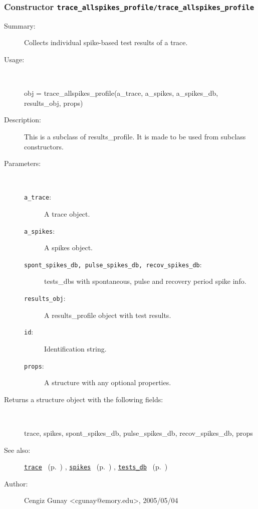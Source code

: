 \subsubsection[Constructor \texttt{trace\_allspikes\_profile}]{Constructor \texttt{trace\_allspikes\_profile/trace\_allspikes\_profile}}%
%
\label{ref_trace_allspikes_profile__trace_allspikes_profile}%
\hypertarget{ref_trace_allspikes_profile__trace_allspikes_profile}{}%
\begin{description}
\item[Summary:]Collects individual spike-based test results of a trace.
%
\item[Usage:]~%
\begin{lyxcode}%
obj = 
   trace\_allspikes\_profile(a\_trace, a\_spikes, a\_spikes\_db, results\_obj, props)
%
\end{lyxcode}%
%
\item[Description:]%
This is a subclass of results\_profile. It is made to be used from 
 subclass constructors.
\item[Parameters:]~
\begin{description}%
\item[\texttt{a\_trace}:]
 A trace object.
\item[\texttt{a\_spikes}:]
 A spikes object.
\item[\texttt{spont\_spikes\_db, pulse\_spikes\_db, recov\_spikes\_db}:]
 

tests\_dbs with spontaneous, pulse and recovery period spike info.
\item[\texttt{results\_obj}:]
 A results\_profile object with test results.
\item[\texttt{id}:]
 Identification string.
\item[\texttt{props}:]
 A structure with any optional properties.
\end{description}%
%
\item[Returns a structure object with the following fields:
]~

	trace, spikes, spont\_spikes\_db, 
	pulse\_spikes\_db, recov\_spikes\_db, props
%
%
\item[See also:]%
\hyperlink{ref_trace}{\texttt{trace}}%
\ (p.~\pageref{ref_trace})%
%
, \hyperlink{ref_spikes}{\texttt{spikes}}%
\ (p.~\pageref{ref_spikes})%
%
, \hyperlink{ref_tests_db}{\texttt{tests\_db}}%
\ (p.~\pageref{ref_tests_db})%
%
%
\item[Author:]%
Cengiz Gunay <cgunay@emory.edu>, 2005/05/04
%
\end{description}
\methodline%
